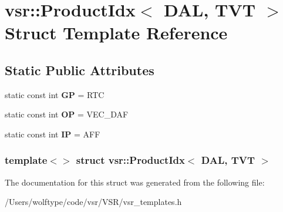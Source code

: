 \hypertarget{structvsr_1_1_product_idx_3_01_d_a_l_00_01_t_v_t_01_4}{\section{vsr\-:\-:Product\-Idx$<$ D\-A\-L, T\-V\-T $>$ Struct Template Reference}
\label{structvsr_1_1_product_idx_3_01_d_a_l_00_01_t_v_t_01_4}
}
\subsection*{Static Public Attributes}
\begin{DoxyCompactItemize}
\item 
\hypertarget{structvsr_1_1_product_idx_3_01_d_a_l_00_01_t_v_t_01_4_a10b38f9adae8ba9c1ed1c2ddab21b018}{static const int {\bfseries G\-P} = R\-T\-C}\label{structvsr_1_1_product_idx_3_01_d_a_l_00_01_t_v_t_01_4_a10b38f9adae8ba9c1ed1c2ddab21b018}

\item 
\hypertarget{structvsr_1_1_product_idx_3_01_d_a_l_00_01_t_v_t_01_4_aa5c18e717278ebb6baa158dbe4e35a83}{static const int {\bfseries O\-P} = V\-E\-C\-\_\-\-D\-A\-F}\label{structvsr_1_1_product_idx_3_01_d_a_l_00_01_t_v_t_01_4_aa5c18e717278ebb6baa158dbe4e35a83}

\item 
\hypertarget{structvsr_1_1_product_idx_3_01_d_a_l_00_01_t_v_t_01_4_a289293ab24b97c59c5f36df262753ef5}{static const int {\bfseries I\-P} = A\-F\-F}\label{structvsr_1_1_product_idx_3_01_d_a_l_00_01_t_v_t_01_4_a289293ab24b97c59c5f36df262753ef5}

\end{DoxyCompactItemize}
\subsubsection*{template$<$$>$ struct vsr\-::\-Product\-Idx$<$ D\-A\-L, T\-V\-T $>$}



The documentation for this struct was generated from the following file\-:\begin{DoxyCompactItemize}
\item 
/\-Users/wolftype/code/vsr/\-V\-S\-R/vsr\-\_\-templates.\-h\end{DoxyCompactItemize}
